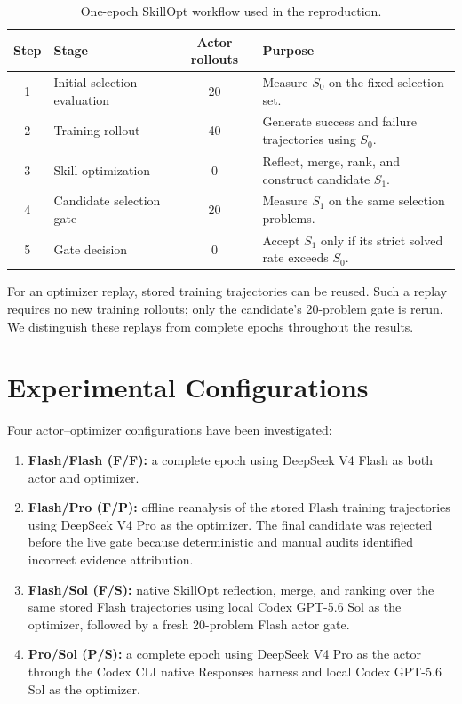 \documentclass[11pt]{article}
\newcommand{\dflash}{DeepSeek V4 Flash}
\newcommand{\dpro}{DeepSeek V4 Pro}
\newcommand{\sol}{GPT-5.6 Sol}
\begin{document}
\begin{table}[h]
\centering
\small
\begin{tabularx}{\textwidth}{@{}clcY@{}}
\toprule
Step & Stage & Actor rollouts & Purpose \\
 & Initial selection evaluation & 20 & Measure $S_0$ on the fixed selection set. \\
2 & Training rollout & 40 & Generate success and failure trajectories using $S_0$. \\
3 & Skill optimization & 0 & Reflect, merge, rank, and construct candidate $S_1$. \\
4 & Candidate selection gate & 20 & Measure $S_1$ on the same selection problems. \\
5 & Gate decision & 0 & Accept $S_1$ only if its strict solved rate exceeds $S_0$. \\
\bottomrule
\end{tabularx}
\caption{One-epoch SkillOpt workflow used in the reproduction.}
\label{tab:workflow}
\end{table}

For an optimizer replay, stored training trajectories can be reused. Such a
replay requires no new training rollouts; only the candidate's 20-problem gate
is rerun. We distinguish these replays from complete epochs throughout the
results.

\section{Experimental Configurations}

Four actor--optimizer configurations have been investigated:

\begin{enumerate}
    \item \textbf{Flash/Flash (F/F):} a complete epoch using \dflash{} as both
    actor and optimizer.
    \item \textbf{Flash/Pro (F/P):} offline reanalysis of the stored Flash
    training trajectories using \dpro{} as the optimizer. The final candidate
    was rejected before the live gate because deterministic and manual audits
    identified incorrect evidence attribution.
    \item \textbf{Flash/Sol (F/S):} native SkillOpt reflection, merge, and
    ranking over the same stored Flash trajectories using local Codex
    \sol{} as the optimizer, followed by a fresh 20-problem Flash actor gate.
    \item \textbf{Pro/Sol (P/S):} a complete epoch using \dpro{} as the actor
    through the Codex CLI native Responses harness and local Codex \sol{} as
    the optimizer.
\end{enumerate}
\end{document}
